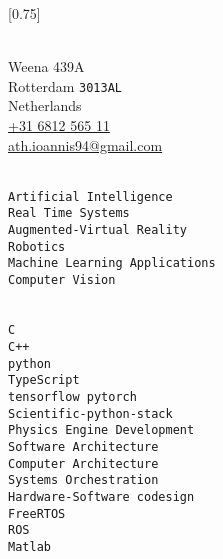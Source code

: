 \documentclass[lighthipster]{simplehipstercv}
\begin{document}
\setlength{\columnsep}{0.8cm}
[0.75]
\begin{paracol}{2}

\paracolbackgroundoptions



\footnotesize
{\setasidefontcolour
\flushright
\begin{center}
\end{center}

\\[0.5em]
{\footnotesize
Weena 439A\\ %
Rotterdam \texttt{3013AL}\\
Netherlands\\[.2cm]
\href{tel:+31681256511}{+31 6812 565 11}\\ %
\href{mailto:ath.ioannis94@gmail.com}{ath.ioannis94@gmail.com}} %
\bigskip

\bigskip

\\[0.5em]
\texttt{Artificial Intelligence}\\[0.1em]
\texttt{Real Time Systems}\\[0.1em]
\texttt{Augmented-Virtual Reality}\\[0.1em]
\texttt{Robotics}\\[0.1em]
\texttt{Machine Learning Applications}\\[0.1em]
\texttt{Computer Vision}\\[0.1em]
\bigskip

\bigskip

\\[0.5em]
\texttt{C}\\
\texttt{C++}\\
\texttt{python}\\
\texttt{TypeScript}\\
\texttt{tensorflow pytorch}\\
\texttt{Scientific-python-stack}\\
\texttt{Physics Engine Development}\\
\texttt{Software Architecture}\\
\texttt{Computer Architecture}\\
\texttt{Systems Orchestration}\\
\texttt{Hardware-Software codesign}\\
\texttt{FreeRTOS}\\
\texttt{ROS}\\
\texttt{Matlab}
\bigskip

}
\end{paracol}
\end{document}
